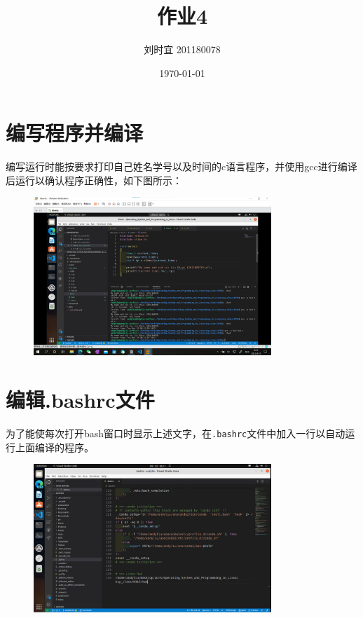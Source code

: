 \documentclass[UTF8]{ctexart}
\title{作业4}
\author{刘时宜 201180078}
\date{\today}
\begin{document}
    \maketitle
    \tableofcontents
    
    \section{编写程序并编译}
    编写运行时能按要求打印自己姓名学号以及时间的c语言程序，并使用gcc进行编译后运行以确认程序正确性，如下图所示：
    \begin{figure}[H]
        \centering
        \includegraphics[width=0.8\textwidth]{assets/1.jpg}
    \end{figure}

    \section{编辑.bashrc文件}
    为了能使每次打开bash窗口时显示上述文字，在\verb|.bashrc|文件中加入一行以自动运行上面编译的程序。
    \begin{figure}[H]
        \centering
        \includegraphics[width=0.8\textwidth]{assets/2.jpg}
    \end{figure}
\end{document}
